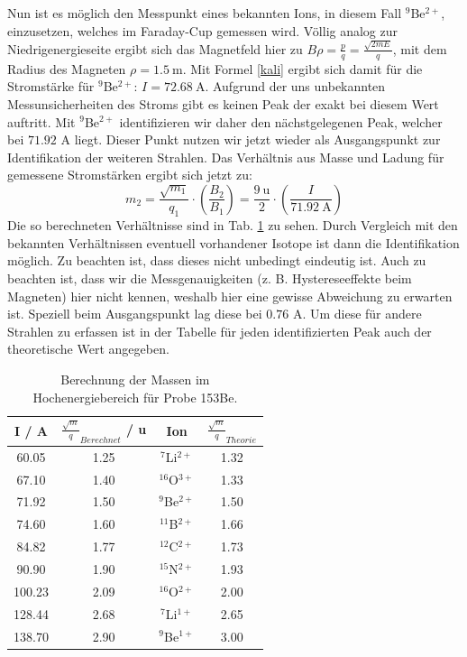 Nun ist es möglich den Messpunkt eines bekannten Ions, in diesem Fall $^{9}$Be$^{2+}$, einzusetzen, welches im Faraday-Cup gemessen wird.
Völlig analog zur Niedrigenergieseite ergibt sich das Magnetfeld hier zu $B \rho = \frac{p}{q} = \frac{\sqrt{2mE}}{q}$, mit dem Radius des Magneten $\rho = \SI{1.5}{\metre}$.
Mit Formel \ref{kali} ergibt sich damit für die Stromstärke für $^{9}$Be$^{2+}$: $I = \SI{72.68}{\ampere}$.
Aufgrund der uns unbekannten Messunsicherheiten des Stroms gibt es keinen Peak der exakt bei diesem Wert auftritt.
Mit $^{9}$Be$^{2+}$ identifizieren wir daher den nächstgelegenen Peak, welcher bei $\num{71.92}$ A liegt.
Dieser Punkt nutzen wir jetzt wieder als Ausgangspunkt zur Identifikation der weiteren Strahlen.
Das Verhältnis aus Masse und Ladung für gemessene Stromstärken ergibt sich jetzt zu:
\begin{equation}
m_2 = \frac{\sqrt{m_1}}{q_1} \cdot \left( \frac{B_2}{B_1} \right) = \frac{\SI{9}{\atomicmassunit}}{2} \cdot \left( \frac{I}{\SI{71.92}{\ampere}} \right)
\end{equation}
Die so berechneten Verhältnisse sind in Tab. \ref{highenergy} zu sehen.
Durch Vergleich mit den bekannten Verhältnissen eventuell vorhandener Isotope ist dann die Identifikation möglich.
Zu beachten ist, dass dieses nicht unbedingt eindeutig ist.
Auch zu beachten ist, dass wir die Messgenauigkeiten (z. B. Hystereseeffekte beim Magneten) hier nicht kennen, weshalb hier eine gewisse Abweichung zu erwarten ist.
Speziell beim Ausgangspunkt lag diese bei $\num{0.76}$ A.
Um diese für andere Strahlen zu erfassen ist in der Tabelle für jeden identifizierten Peak auch der theoretische Wert angegeben.

\begin{table}[h]
\centering
\caption{Berechnung der Massen im Hochenergiebereich für Probe 153Be.}
\begin{tabular}{|c |c| c|c|}
\hline
I / \si{A} & $\frac{\sqrt{m}}{q}_{Berechnet}$ / \si{\atomicmassunit} & Ion & $\frac{\sqrt{m}}{q}_{Theorie}$ \\
\hline
\num{60.05}   & \num{1.25} &  $^{7}$Li$^{2+}$ & \num{1.32} \\
\num{67.10}   & \num{1.40} &  $^{16}$O$^{3+}$ & \num{1.33} \\
\num{71.92}  & \num{1.50}  &  $^{9}$Be$^{2+}$ & \num{1.50}\\
\num{74.60}  & \num{1.60}  &  $^{11}$B$^{2+}$ & \num{1.66}\\
\num{84.82}  & \num{1.77}  &  $^{12}$C$^{2+}$ & \num{1.73}\\
\num{90.90}  & \num{1.90}  &  $^{15}$N$^{2+}$ & \num{1.93}\\
\num{100.23} & \num{2.09} &  $^{16}$O$^{2+}$  & \num{2.00}\\
\num{128.44} & \num{2.68} &  $^{7}$Li$^{1+}$  & \num{2.65}\\
\num{138.70} & \num{2.90} &  $^{9}$Be$^{1+}$  & \num{3.00}\\
\hline
\end{tabular}
\label{highenergy}
\end{table}

